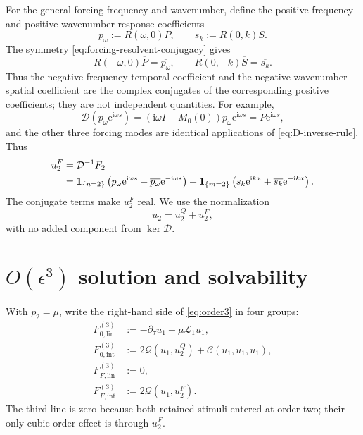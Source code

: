 \documentclass[11pt]{article}
\newcommand{\ii}{\mathrm{i}}
\newcommand{\ee}{\mathrm{e}}
\newcommand{\cQ}{\mathcal{Q}}
\newcommand{\cC}{\mathcal{C}}
\newcommand{\cL}{\mathcal{L}}
\newcommand{\cD}{\mathcal{D}}
\newcommand{\one}[1]{\bm{1}_{\{#1\}}}
\begin{document}
For the general forcing frequency and wavenumber, define the
positive-frequency and positive-wavenumber response coefficients
\begin{equation}
\label{eq:forcing-responses}
 p_\omega:=R(\omega,0)P,
 \qquad
 s_k:=R(0,k)S.
\end{equation}
The symmetry \eqref{eq:forcing-resolvent-conjugacy} gives
\begin{equation}
 R(-\omega,0)\overline P=\overline{p_\omega},
 \qquad
 R(0,-k)\overline S=\overline{s_k}.
 \label{eq:forcing-response-conjugacy}
\end{equation}
Thus the negative-frequency temporal coefficient and the negative-wavenumber
spatial coefficient are the complex conjugates of the corresponding positive
coefficients; they are not independent quantities.
For example,
\begin{equation}
 \cD\left(p_\omega\ee^{\ii\omega s}\right)
 =(\ii\omega I-M_0(0))p_\omega\ee^{\ii\omega s}
 =P\ee^{\ii\omega s},
\end{equation}
and the other three forcing modes are identical applications of
\eqref{eq:D-inverse-rule}.  Thus
\begin{align}
 u_2^F={}&\cD^{-1}F_2\notag\\
 ={}&\one{n=2}\left(
 p_\omega\ee^{\ii\omega s}+\overline{p_\omega}\ee^{-\ii\omega s}\right)
 +\one{m=2}\left(
 s_k\ee^{\ii kx}+\overline{s_k}\ee^{-\ii kx}\right).
 \label{eq:u2F}
\end{align}
The conjugate terms make $u_2^F$ real.  We use the normalization
\begin{equation}
 \boxed{u_2=u_2^Q+u_2^F,}
 \label{eq:u2-total}
\end{equation}
with no added component from $\ker\cD$.

\section{\texorpdfstring{$O(\epsilon^3)$}{O(epsilon cubed)} solution and
solvability}

With $p_2=\mu$, write the right-hand side of \eqref{eq:order3} in four
groups:
\begin{align}
 F_{0,\mathrm{lin}}^{(3)}
 &:=-\partial_\tau u_1+\mu\cL_1u_1,
 \label{eq:F0lin}\\
 F_{0,\mathrm{int}}^{(3)}
 &:=2\cQ(u_1,u_2^Q)+\cC(u_1,u_1,u_1),
 \label{eq:F0int}\\
 F_{F,\mathrm{lin}}^{(3)}&:=0,
 \label{eq:FFlin}\\
 F_{F,\mathrm{int}}^{(3)}&:=2\cQ(u_1,u_2^F).
 \label{eq:FFint}
\end{align}
The third line is zero because both retained stimuli entered at order two;
their only cubic-order effect is through $u_2^F$.
\end{document}
